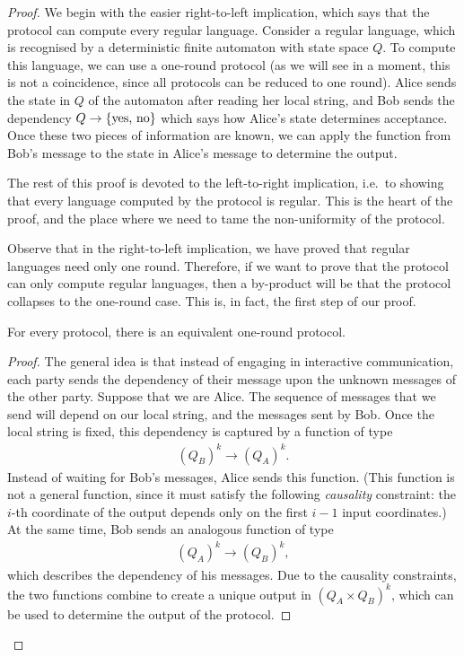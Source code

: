 \begin{proof}
  We begin with the easier right-to-left implication, which says that the protocol can compute every regular language. Consider a regular language, which is recognised by a deterministic finite automaton with state space $Q$. To compute this language, we can use a  one-round protocol (as we will see in a moment, this is not a coincidence, since all protocols can be reduced to one round). Alice sends the state in $Q$ of the automaton after reading her local string, and Bob sends the dependency $Q \to \{\text{yes, no}\}$ which says how Alice's state determines acceptance. Once these two pieces of information are known, we can apply the function from Bob's message to the state in Alice's message to determine the output.

  The rest of this proof is devoted to the left-to-right implication, i.e.~to showing that every language computed by the protocol is regular. This is the heart of the proof, and the place where we need to tame the non-uniformity of the protocol. 
  
  Observe that in the right-to-left implication, we have proved that regular languages need only one round. Therefore, if we want to  prove that the protocol can only compute regular languages, then a by-product will be that the protocol collapses to the one-round case.  This is, in fact, the first step of our proof. 
  \begin{lemma}\label{lem:one-round-reduction-boolean}
    For every protocol, there is an equivalent one-round protocol. 
  \end{lemma}
  \begin{proof}
    The general idea is that instead of engaging in interactive communication, each party sends the dependency of their message upon the unknown messages of the other party. Suppose that we are  Alice. The sequence of messages that we send will depend on our local string, and  the messages sent by Bob. Once the local string is fixed, this dependency is captured by a function of type 
    \begin{align*}
    (Q_B)^k \to (Q_A)^k.
    \end{align*}
    Instead of waiting for Bob's messages, Alice sends this function. (This function is not a general function, since it must satisfy the following \emph{causality} constraint: the $i$-th coordinate of the output depends only on the first $i-1$ input coordinates.) At the same time, Bob sends an analogous function of type 
    \begin{align*}
    (Q_A)^k \to (Q_B)^k,
    \end{align*}
    which describes the dependency of his messages. Due to the causality constraints, the two functions combine to create a unique output in $(Q_A \times Q_B)^k$, which can be used to determine the output of the protocol.
  \end{proof}


\end{proof}
